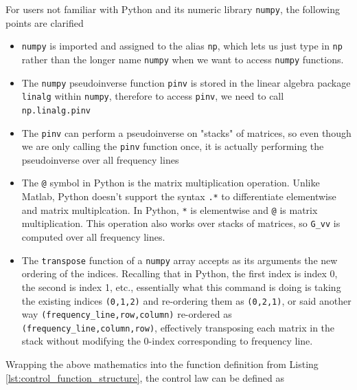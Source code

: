 \documentclass[pdf,12pt,report]{SANDreport}
\newcommand{\inlineCode}{\lstinline[basicstyle=\bfseries\ttfamily]}
\begin{document}
    For users not familiar with Python and its numeric library \inlineCode{numpy}, the following points are clarified
    \begin{itemize}
        \item \inlineCode{numpy} is imported and assigned to the alias \inlineCode{np}, which lets us just type in \inlineCode{np} rather than the longer name \inlineCode{numpy} when we want to access \inlineCode{numpy} functions.
        \item The \inlineCode{numpy} pseudoinverse function \inlineCode{pinv} is stored in the linear algebra package \inlineCode{linalg} within \inlineCode{numpy}, therefore to access \inlineCode{pinv}, we need to call \inlineCode{np.linalg.pinv}
        \item The \inlineCode{pinv} can perform a pseudoinverse on "stacks" of matrices, so even though we are only calling the \inlineCode{pinv} function once, it is actually performing the pseudoinverse over all frequency lines
        \item The \inlineCode{@} symbol in Python is the matrix multiplication operation.  Unlike Matlab, Python doesn't support the syntax \inlineCode{.*} to differentiate elementwise and matrix multiplcation.  In Python, \inlineCode{*} is elementwise and \inlineCode{@} is matrix multiplication.  This operation also works over stacks of matrices, so \inlineCode{G_vv} is computed over all frequency lines.
        \item The \inlineCode{transpose} function of a \inlineCode{numpy} array accepts as its arguments the new ordering of the indices.  Recalling that in Python, the first index is index 0, the second is index 1, etc., essentially what this command is doing is taking the existing indices \inlineCode{(0,1,2)} and re-ordering them as \inlineCode{(0,2,1)}, or said another way \inlineCode{(frequency_line,row,column)} re-ordered as \inlineCode{(frequency_line,column,row)}, effectively transposing each matrix in the stack without modifying the 0-index corresponding to frequency line.
    \end{itemize}
    
    Wrapping the above mathematics into the function definition from Listing \ref{lst:control_function_structure}, the control law can be defined as
    
\end{document}
